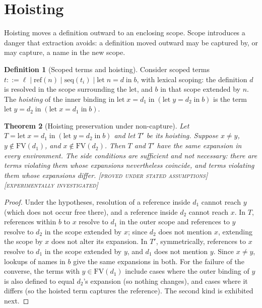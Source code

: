 \documentclass[11pt,twoside,openright]{book}
\theoremstyle{plain}
\newtheorem{theorem}{Theorem}[chapter]
\theoremstyle{definition}
\newtheorem{definition}[theorem]{Definition}
\theoremstyle{remark}
\newcommand{\Proved}{\textup{\textsc{[proved under stated assumptions]}}}
\newcommand{\Tested}{\textup{\textsc{[experimentally investigated]}}}
\begin{document}
\section{Hoisting}

Hoisting moves a definition outward to an enclosing scope. Scope introduces a danger that extraction avoids: a definition moved outward may be captured by, or may capture, a name in the new scope.

\begin{definition}[Scoped terms and hoisting]\label{def:hoist}
Consider scoped terms $t::=\ell\mid\mathrm{ref}(n)\mid\mathrm{seq}(t_i)\mid\mathrm{let}\;n=d\;\mathrm{in}\;b$, with lexical scoping: the definition $d$ is resolved in the scope surrounding the $\mathrm{let}$, and $b$ in that scope extended by $n$. The \emph{hoisting} of the inner binding in $\mathrm{let}\;x=d_1\;\mathrm{in}\;(\mathrm{let}\;y=d_2\;\mathrm{in}\;b)$ is the term $\mathrm{let}\;y=d_2\;\mathrm{in}\;(\mathrm{let}\;x=d_1\;\mathrm{in}\;b)$.
\end{definition}

\begin{theorem}[Hoisting preservation under non-capture]\label{thm:hoisting}
Let $T=\mathrm{let}\;x=d_1\;\mathrm{in}\;(\mathrm{let}\;y=d_2\;\mathrm{in}\;b)$ and let $T'$ be its hoisting. Suppose $x\ne y$, $y\notin\mathrm{FV}(d_1)$, and $x\notin\mathrm{FV}(d_2)$. Then $T$ and $T'$ have the same expansion in every environment. The side conditions are sufficient and not necessary: there are terms violating them whose expansions nevertheless coincide, and terms violating them whose expansions differ.
\Proved{} \Tested{}
\end{theorem}

\begin{proof}
Under the hypotheses, resolution of a reference inside $d_1$ cannot reach $y$ (which does not occur free there), and a reference inside $d_2$ cannot reach $x$. In $T$, references within $b$ to $x$ resolve to $d_1$ in the outer scope and references to $y$ resolve to $d_2$ in the scope extended by $x$; since $d_2$ does not mention $x$, extending the scope by $x$ does not alter its expansion. In $T'$, symmetrically, references to $x$ resolve to $d_1$ in the scope extended by $y$, and $d_1$ does not mention $y$. Since $x\neq y$, lookups of names in $b$ give the same expansions in both. For the failure of the converse, the terms with $y\in\mathrm{FV}(d_1)$ include cases where the outer binding of $y$ is also defined to equal $d_2$'s expansion (so nothing changes), and cases where it differs (so the hoisted term captures the reference). The second kind is exhibited next.
\end{proof}
\end{document}
